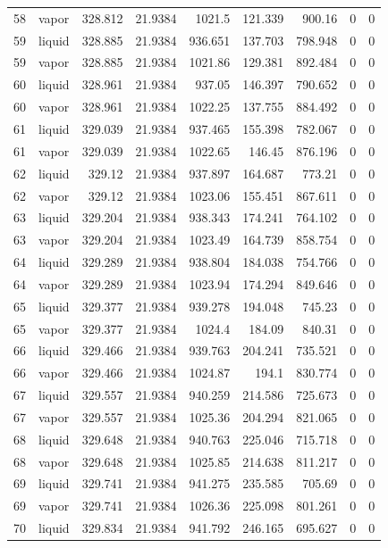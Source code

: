 \begin{longtable}{r l r r r r r r r}
58 & vapor & 328.812 & 21.9384 & 1021.5 & 121.339 & 900.16 & 0 & 0 \\
59 & liquid & 328.885 & 21.9384 & 936.651 & 137.703 & 798.948 & 0 & 0 \\
59 & vapor & 328.885 & 21.9384 & 1021.86 & 129.381 & 892.484 & 0 & 0 \\
60 & liquid & 328.961 & 21.9384 & 937.05 & 146.397 & 790.652 & 0 & 0 \\
60 & vapor & 328.961 & 21.9384 & 1022.25 & 137.755 & 884.492 & 0 & 0 \\
61 & liquid & 329.039 & 21.9384 & 937.465 & 155.398 & 782.067 & 0 & 0 \\
61 & vapor & 329.039 & 21.9384 & 1022.65 & 146.45 & 876.196 & 0 & 0 \\
62 & liquid & 329.12 & 21.9384 & 937.897 & 164.687 & 773.21 & 0 & 0 \\
62 & vapor & 329.12 & 21.9384 & 1023.06 & 155.451 & 867.611 & 0 & 0 \\
63 & liquid & 329.204 & 21.9384 & 938.343 & 174.241 & 764.102 & 0 & 0 \\
63 & vapor & 329.204 & 21.9384 & 1023.49 & 164.739 & 858.754 & 0 & 0 \\
64 & liquid & 329.289 & 21.9384 & 938.804 & 184.038 & 754.766 & 0 & 0 \\
64 & vapor & 329.289 & 21.9384 & 1023.94 & 174.294 & 849.646 & 0 & 0 \\
65 & liquid & 329.377 & 21.9384 & 939.278 & 194.048 & 745.23 & 0 & 0 \\
65 & vapor & 329.377 & 21.9384 & 1024.4 & 184.09 & 840.31 & 0 & 0 \\
66 & liquid & 329.466 & 21.9384 & 939.763 & 204.241 & 735.521 & 0 & 0 \\
66 & vapor & 329.466 & 21.9384 & 1024.87 & 194.1 & 830.774 & 0 & 0 \\
67 & liquid & 329.557 & 21.9384 & 940.259 & 214.586 & 725.673 & 0 & 0 \\
67 & vapor & 329.557 & 21.9384 & 1025.36 & 204.294 & 821.065 & 0 & 0 \\
68 & liquid & 329.648 & 21.9384 & 940.763 & 225.046 & 715.718 & 0 & 0 \\
68 & vapor & 329.648 & 21.9384 & 1025.85 & 214.638 & 811.217 & 0 & 0 \\
69 & liquid & 329.741 & 21.9384 & 941.275 & 235.585 & 705.69 & 0 & 0 \\
69 & vapor & 329.741 & 21.9384 & 1026.36 & 225.098 & 801.261 & 0 & 0 \\
70 & liquid & 329.834 & 21.9384 & 941.792 & 246.165 & 695.627 & 0 & 0 \\

\end{longtable}
